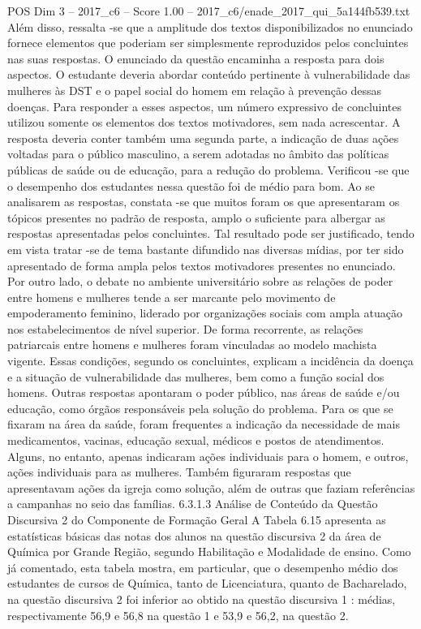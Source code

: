 \begin{textsample}{POS Dim 3 – 2017\_c6 – Score 1.00 – 2017\_c6/enade\_2017\_qui\_5a144fb539.txt}
Além disso, ressalta -se que a amplitude dos textos disponibilizados no enunciado fornece elementos que poderiam ser simplesmente reproduzidos pelos concluintes nas suas respostas.
O enunciado da questão encaminha a resposta para dois aspectos.
O estudante deveria abordar conteúdo pertinente à vulnerabilidade das mulheres às DST e o papel social do homem em relação à prevenção dessas doenças.
Para responder a esses aspectos, um número expressivo de concluintes utilizou somente os elementos dos textos motivadores, sem nada acrescentar.
A resposta deveria conter também uma segunda parte, a indicação de duas ações voltadas para o público masculino, a serem adotadas no âmbito das políticas públicas de saúde ou de educação, para a redução do problema.
Verificou -se que o desempenho dos estudantes nessa questão foi de médio para bom.
Ao se analisarem as respostas, constata -se que muitos foram os que apresentaram os tópicos presentes no padrão de resposta, amplo o suficiente para albergar as respostas apresentadas pelos concluintes.
Tal resultado pode ser justificado, tendo em vista tratar -se de tema bastante difundido nas diversas mídias, por ter sido apresentado de forma ampla pelos textos motivadores presentes no enunciado.
Por outro lado, o debate no ambiente universitário sobre as relações de poder entre homens e mulheres tende a ser marcante pelo movimento de empoderamento feminino, liderado por organizações sociais com ampla atuação nos estabelecimentos de nível superior.
De forma recorrente, as relações patriarcais entre homens e mulheres foram vinculadas ao modelo machista vigente.
Essas condições, segundo os concluintes, explicam a incidência da doença e a situação de vulnerabilidade das mulheres, bem como a função social dos homens.
Outras respostas apontaram o poder público, nas áreas de saúde e/ou educação, como órgãos responsáveis pela solução do problema.
Para os que se fixaram na área da saúde, foram frequentes a indicação da necessidade de mais medicamentos, vacinas, educação sexual, médicos e postos de atendimentos.
Alguns, no entanto, apenas indicaram ações individuais para o homem, e outros, ações individuais para as mulheres.
Também figuraram respostas que apresentavam ações da igreja como solução, além de outras que faziam referências a campanhas no seio das famílias. 6.3.1.3 Análise de Conteúdo da Questão Discursiva 2 do Componente de Formação Geral A Tabela 6.15 apresenta as estatísticas básicas das notas dos alunos na questão discursiva 2 da área de Química por Grande Região, segundo Habilitação e Modalidade de ensino.
Como já comentado, esta tabela mostra, em particular, que o desempenho médio dos estudantes de cursos de Química, tanto de Licenciatura, quanto de Bacharelado, na questão discursiva 2 foi inferior ao obtido na questão discursiva 1 : médias, respectivamente 56,9 e 56,8 na questão 1 e 53,9 e 56,2, na questão 2.

\end{textsample}
